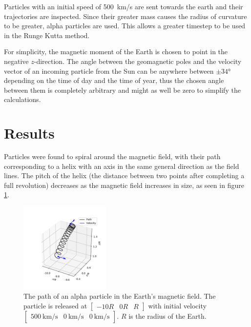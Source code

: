 \documentclass[5p,sort&compress]{elsarticle}
\begin{document}
Particles with an initial speed of \SI{500}{\kilo \meter /\second} are sent towards the earth and their trajectories are inspected. Since their greater mass causes the radius of curvature to be greater, alpha particles are used. This allows a greater timestep to be used in the Runge Kutta method.

For simplicity, the magnetic moment of the Earth is chosen to point in the negative $z$-direction. The angle between the geomagnetic poles and the velocity vector of an incoming particle from the Sun can be anywhere between $\pm \ang{34}$ depending on the time of day and the time of year, thus the chosen angle between them is completely arbitrary and might as well be zero to simplify the calculations.

\section{Results}
Particles were found to spiral around the magnetic field, with their path corresponding to a helix with an axis in the same general direction as the field lines. The pitch of the helix (the distance between two points after completing a full revolution) decreases as the magnetic field increases in size, as seen in figure \ref{fig:helical1}.

\begin{figure}[h]
    \centering
    \includegraphics[width=0.4\textwidth]{figure1.pdf}
    \caption{The path of an alpha particle in the Earth's magnetic field. The particle is released at $\begin{bmatrix} -10R&0R&R \end{bmatrix}$ with initial velocity $\begin{bmatrix} \SI{500}{\kilo \meter /\second}&\SI{0}{\kilo \meter /\second}&\SI{0}{\kilo \meter /\second} \end{bmatrix}$. $R$ is the radius of the Earth.}
    \label{fig:helical1}
\end{figure}
\end{document}
